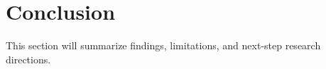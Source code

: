 \section{Conclusion}

This section will summarize findings, limitations, and next-step research directions.
